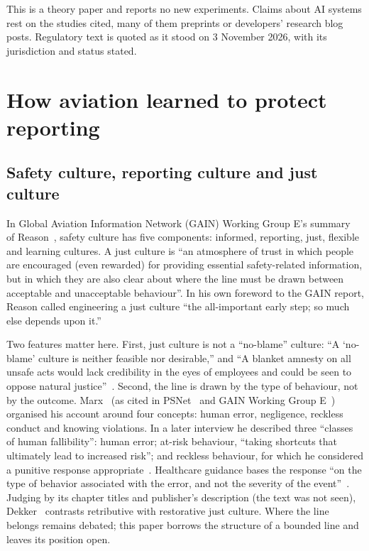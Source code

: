 \documentclass[11pt]{article}
\begin{document}
This is a theory paper and reports no new experiments. Claims about AI systems rest on the studies cited, many of them preprints or developers' research blog posts. Regulatory text is quoted as it stood on 3 November 2026, with its jurisdiction and status stated.

\section{How aviation learned to protect reporting}\label{sec:aviation}

\subsection{Safety culture, reporting culture and just culture}\label{sec:culture}

In Global Aviation Information Network (GAIN) Working Group E's summary~\cite[Sec.~2.1 and Figure~1]{gain2004} of Reason~\cite{reason1997}, safety culture has five components: informed, reporting, just, flexible and learning cultures. A just culture is ``an atmosphere of trust in which people are encouraged (even rewarded) for providing essential safety-related information, but in which they are also clear about where the line must be drawn between acceptable and unacceptable behaviour''. In his own foreword to the GAIN report, Reason called engineering a just culture ``the all-important early step; so much else depends upon it.''

Two features matter here. First, just culture is not a ``no-blame'' culture: ``A `no-blame' culture is neither feasible nor desirable,'' and ``A blanket amnesty on all unsafe acts would lack credibility in the eyes of employees and could be seen to oppose natural justice''~\cite[Sec.~1.4]{gain2004}. Second, the line is drawn by the type of behaviour, not by the outcome. Marx~\cite{marx2001} (as cited in PSNet~\cite{psnet_marx} and GAIN Working Group E~\cite[Sec.~2.3]{gain2004}) organised his account around four concepts: human error, negligence, reckless conduct and knowing violations. In a later interview he described three ``classes of human fallibility'': human error; at-risk behaviour, ``taking shortcuts that ultimately lead to increased risk''; and reckless behaviour, for which he considered a punitive response appropriate~\cite{psnet2007}. Healthcare guidance bases the response ``on the type of behavior associated with the error, and not the severity of the event''~\cite{ucdavis2024}. Judging by its chapter titles and publisher's description (the text was not seen), Dekker~\cite{dekker2025} contrasts retributive with restorative just culture. Where the line belongs remains debated; this paper borrows the structure of a bounded line and leaves its position open.
\end{document}
